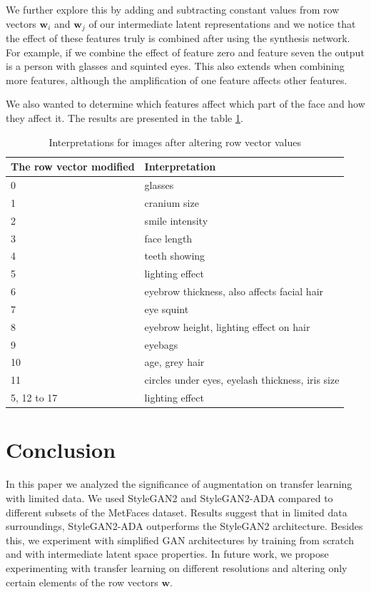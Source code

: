 \documentclass[conference]{IEEEtran}
\begin{document}
We further explore this by adding and subtracting constant values from row vectors $\mathbf{w}_i$ and $\mathbf{w}_j$ of our intermediate latent representations and we notice that the effect of these features truly is combined after using the synthesis network. For example, if we combine the effect of feature zero and feature seven the output is a person with glasses and squinted eyes. This also extends when combining more features, although the amplification of one feature affects other features.

We also wanted to determine which features affect which part of the face and how they affect it. The results are presented in the table \ref{tab:interpretations}. 
\begin{table}[!h]

		\caption{Interpretations for images after altering row vector values}
		\label{tab:interpretations}
		\begin{center}
			\begin{tabular}{ll}
				\toprule
				The row vector modified & Interpretation \\
				\midrule
				0 & glasses \\
				1 & cranium size\\
				2 & smile intensity\\
				3 & face length\\
				4 & teeth showing\\
				5 & lighting effect\\
				6 & eyebrow thickness, also affects facial hair\\
				7 & eye squint\\
				8 & eyebrow height, lighting effect on hair\\
				9 & eyebags\\
				10 & age, grey hair\\
				11 & circles under eyes, eyelash thickness, iris size\\
				5, 12 to 17 & lighting effect\\           
				\bottomrule
			\end{tabular}
		\end{center}
	\end{table}

\section{Conclusion}

In this paper we analyzed the significance of augmentation on transfer learning with limited data. We used StyleGAN2 and StyleGAN2-ADA compared to different subsets of the MetFaces dataset. Results suggest that in limited data surroundings, StyleGAN2-ADA outperforms the StyleGAN2 architecture. Besides this, we experiment with simplified GAN architectures by training from scratch and with intermediate latent space properties. In future work, we propose experimenting with transfer learning on different resolutions and altering only certain elements of the row vectors $\mathbf{w}$.
\end{document}
